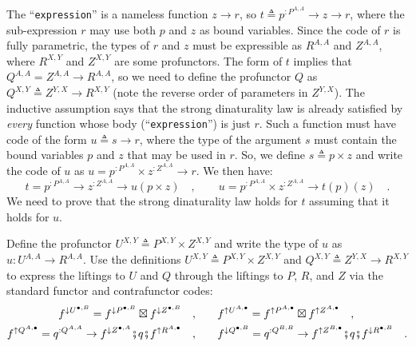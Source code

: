 The \textsf{``}\lstinline!expression!\textsf{''} is a nameless function $z\rightarrow r$,
so $t\triangleq p^{:P^{A,A}}\rightarrow z\rightarrow r$, where the
sub-expression $r$ may use both $p$ and $z$ as bound variables.
Since the code of $r$ is fully parametric, the types of $r$ and
$z$ must be expressible as $R^{A,A}$ and $Z^{A,A}$, where $R^{X,Y}$
and $Z^{X,Y}$ are some profunctors. The form of $t$ implies that
$Q^{A,A}=Z^{A,A}\rightarrow R^{A,A}$, so we need to define the profunctor
$Q$ as $Q^{X,Y}\triangleq Z^{Y,X}\rightarrow R^{X,Y}$ (note the
reverse order of parameters in $Z^{Y,X}$). The inductive assumption
says that the strong dinaturality law is already satisfied by \emph{every}
function whose body (\textsf{``}\lstinline!expression!\textsf{''}) is just $r$.
Such a function must have code of the form $u\triangleq s\rightarrow r$,
where the type of the argument $s$ must contain the bound variables
$p$ and $z$ that may be used in $r$. So, we define $s\triangleq p\times z$
and write the code of $u$ as $u=p^{:P^{A,A}}\times z^{:Z^{A,A}}\rightarrow r$.
We then have:
\begin{equation}
t=p^{:P^{A,A}}\rightarrow z^{:Z^{A,A}}\rightarrow u(p\times z)\quad,\quad\quad u=p^{:P^{A,A}}\times z^{:Z^{A,A}}\rightarrow t(p)(z)\quad.\label{eq:dinaturality-u-function-type-derivation0}
\end{equation}
We need to prove that the strong dinaturality law holds for $t$ assuming
that it holds for $u$.

Define the profunctor $U^{X,Y}\triangleq P^{X,Y}\times Z^{X,Y}$ and
write the type of $u$ as $u:U^{A,A}\rightarrow R^{A,A}$. Use the
definitions $U^{X,Y}\triangleq P^{X,Y}\times Z^{X,Y}$ and $Q^{X,Y}\triangleq Z^{Y,X}\rightarrow R^{X,Y}$
to express the liftings to $U$ and $Q$ through the liftings to $P$,
$R$, and $Z$ via the standard functor and contrafunctor codes:
\begin{align}
f^{\downarrow U^{\bullet,B}}=f^{\downarrow P^{\bullet,B}}\boxtimes f^{\downarrow Z^{\bullet,B}}\quad, & \quad\quad f^{\uparrow U^{A,\bullet}}=f^{\uparrow P^{A,\bullet}}\boxtimes f^{\uparrow Z^{A,\bullet}}\quad,\label{eq:dinaturality-u-function-type-derivation2}\\
f^{\uparrow Q^{A,\bullet}}=q^{:Q^{A,A}}\rightarrow f^{\downarrow Z^{\bullet,A}}\bef q\bef f^{\uparrow R^{A,\bullet}}\quad, & \quad\quad f^{\downarrow Q^{\bullet,B}}=q^{:Q^{B,B}}\rightarrow f^{\uparrow Z^{B,\bullet}}\bef q\bef f^{\downarrow R^{\bullet,B}}\quad.\label{eq:dinaturality-u-function-type-derivation3}
\end{align}

